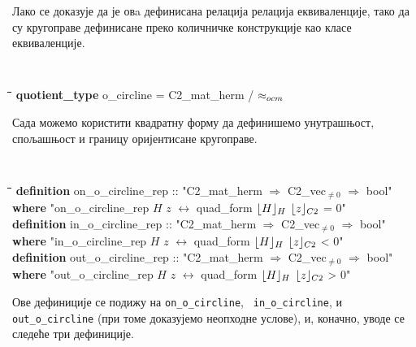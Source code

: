 Лако се доказује да је овa дефинисана релација релација еквиваленције,
тако да су кругоправе дефинисане преко количничке конструкције као
класе еквиваленције.

{\tt
\begin{tabbing}
\hspace{5mm}\=\hspace{5mm}\=\hspace{5mm}\=\hspace{5mm}\=\hspace{5mm}\=\kill
\textbf{quotient\_type} o\_circline = C2\_mat\_herm / $\approx_{ocm}$
\end{tabbing}
}

Сада можемо користити квадратну форму да дефинишемо унутрашњост,
спољашњост и границу оријентисане кругоправе.

{\tt
\begin{tabbing}
\hspace{5mm}\=\hspace{5mm}\=\hspace{5mm}\=\hspace{5mm}\=\hspace{5mm}\=\kill
\textbf{definition} on\_o\_circline\_rep :: "C2\_mat\_herm $\Rightarrow$ C2\_vec$_{\neq 0}$ $\Rightarrow$ bool"\\
\>\textbf{where} "on\_o\_circline\_rep $H$ $z$ $\longleftrightarrow$ quad\_form $\lfloor H\rfloor_{H}$ $\lfloor z\rfloor_{C2}$ = 0"\\
\textbf{definition} in\_o\_circline\_rep :: "C2\_mat\_herm $\Rightarrow$ C2\_vec$_{\neq 0}$ $\Rightarrow$ bool"\\
\>\textbf{where} "in\_o\_circline\_rep $H$ $z$ $\longleftrightarrow$ quad\_form $\lfloor H\rfloor_{H}$ $\lfloor z\rfloor_{C2}$ < 0"\\
\textbf{definition} out\_o\_circline\_rep :: "C2\_mat\_herm $\Rightarrow$ C2\_vec$_{\neq 0}$ $\Rightarrow$ bool"\\
\>\textbf{where} "out\_o\_circline\_rep $H$ $z$ $\longleftrightarrow$ quad\_form $\lfloor H\rfloor_{H}$ $\lfloor z\rfloor_{C2}$ > 0"
\end{tabbing}
}

\noindent Ове дефиниције се подижу на {\tt on\_o\_circline}, {\tt
  in\_o\_circline}, и {\tt out\_o\_circline} (при томе доказујемо
неопходне услове), и, коначно, уводе се следеће три дефиниције.

